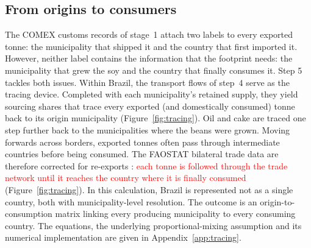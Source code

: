\documentclass[pdflatex,sn-nature]{sn-jnl}%
\begin{document}
\subsection{From origins to consumers}\label{subsec:origin2consumer}
The COMEX customs records of stage~1 attach two labels to every exported
tonne: the municipality that shipped it and the country that first
imported it. However, neither label contains the information that the
footprint needs: the municipality that grew the soy and the country that
finally consumes it. Step 5 tackles both issues. Within Brazil, the
transport flows of step~4 serve as the tracing device. Completed with
each municipality's retained supply, they yield sourcing shares that trace
every exported (and domestically consumed) tonne back to its origin
municipality (Figure~\ref{fig:tracing}). Oil and cake are traced one step
further back to the municipalities where the beans were grown. Moving
forwards across borders, exported tonnes often pass through intermediate
countries before being consumed. The FAOSTAT bilateral trade data are
therefore corrected for re-exports \cite{kastner2011tracing}: \textcolor{red}{each tonne
is followed through the trade network until it reaches the country where
it is finally consumed} (Figure~\ref{fig:tracing}). In this calculation,
Brazil is represented not as a single country, both with municipality-level resolution. The outcome is an origin-to-consumption matrix linking every
producing municipality to every consuming country. The equations, the
underlying proportional-mixing assumption and its numerical implementation
are given in Appendix~\ref{app:tracing}.
\end{document}
